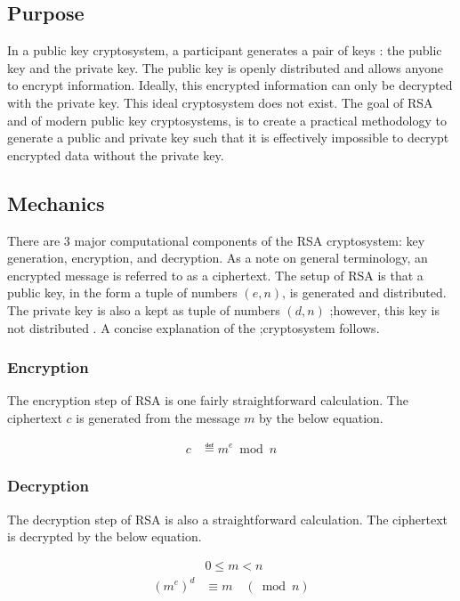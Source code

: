 \documentclass[journal]{IEEEtran}
\begin{document}
\subsection{Purpose}

In a public key cryptosystem, a participant generates a pair of keys : the
public key and the private key. The public key is openly distributed and allows
anyone to encrypt information. Ideally, this encrypted information can only be
decrypted with the private key. This ideal cryptosystem does not exist. The goal
of RSA and of modern public key cryptosystems, is to create a practical
methodology to generate a public and private key such that it is effectively
impossible to decrypt encrypted data without the private key.

\subsection{Mechanics}

There are 3 major computational components of the RSA cryptosystem: key
generation, encryption, and decryption. As a note on general terminology, an
encrypted message is referred to as a ciphertext.  The setup of RSA is that a
public key, in the form a tuple of numbers \((e, n)\), is generated and
distributed. The private key is also a kept as tuple of numbers \((d,n)\)
;however, this key is not distributed .  A concise explanation of the
;cryptosystem follows.

\subsubsection{Encryption}

The encryption step of RSA is one fairly straightforward calculation. The
ciphertext \(c\) is generated from the message \(m\) by the below equation.

\begin{align*}
    c & \eqdef m^{e}\bmod n
\end{align*}

\subsubsection{Decryption}

The decryption step of RSA is also a straightforward calculation. The
ciphertext is decrypted by the below equation.

\begin{align*}
                            & 0\leqslant m< n         \\
    \left( m^{e}\right)^{d} & \equiv m\quad (\bmod n)
\end{align*}
\end{document}
